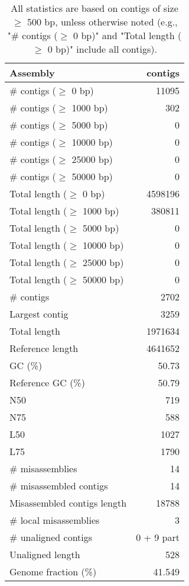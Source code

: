 \documentclass[12pt,a4paper]{article}
\begin{document}
\begin{table}[ht]
\begin{center}
\caption{All statistics are based on contigs of size $\geq$ 500 bp, unless otherwise noted (e.g., "\# contigs ($\geq$ 0 bp)" and "Total length ($\geq$ 0 bp)" include all contigs).}
\begin{tabular}{|l*{1}{|r}|}
\hline
Assembly & contigs \\ \hline
\# contigs ($\geq$ 0 bp) & 11095 \\ \hline
\# contigs ($\geq$ 1000 bp) & 302 \\ \hline
\# contigs ($\geq$ 5000 bp) & 0 \\ \hline
\# contigs ($\geq$ 10000 bp) & 0 \\ \hline
\# contigs ($\geq$ 25000 bp) & 0 \\ \hline
\# contigs ($\geq$ 50000 bp) & 0 \\ \hline
Total length ($\geq$ 0 bp) & 4598196 \\ \hline
Total length ($\geq$ 1000 bp) & 380811 \\ \hline
Total length ($\geq$ 5000 bp) & 0 \\ \hline
Total length ($\geq$ 10000 bp) & 0 \\ \hline
Total length ($\geq$ 25000 bp) & 0 \\ \hline
Total length ($\geq$ 50000 bp) & 0 \\ \hline
\# contigs & 2702 \\ \hline
Largest contig & 3259 \\ \hline
Total length & 1971634 \\ \hline
Reference length & 4641652 \\ \hline
GC (\%) & 50.73 \\ \hline
Reference GC (\%) & 50.79 \\ \hline
N50 & 719 \\ \hline
N75 & 588 \\ \hline
L50 & 1027 \\ \hline
L75 & 1790 \\ \hline
\# misassemblies & 14 \\ \hline
\# misassembled contigs & 14 \\ \hline
Misassembled contigs length & 18788 \\ \hline
\# local misassemblies & 3 \\ \hline
\# unaligned contigs & 0 + 9 part \\ \hline
Unaligned length & 528 \\ \hline
Genome fraction (\%) & 41.549 \\ \hline

\end{tabular}
\end{center}
\end{table}
\end{document}
